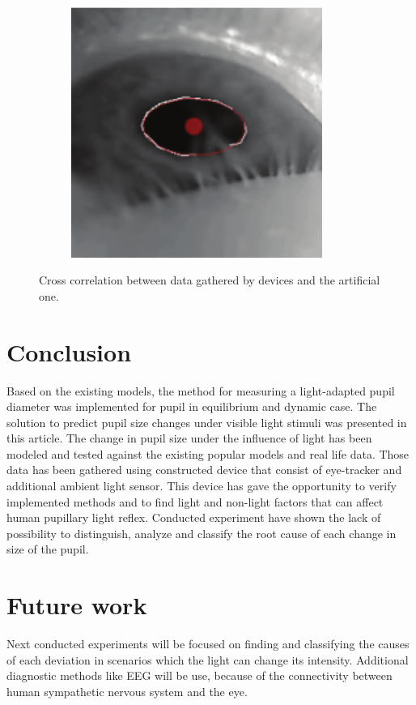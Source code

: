 \documentclass[USenglish,twocolumn]{article}
\begin{document}
\begin{figure}[H]
	\begin{subfigure}[b]{0.45\textwidth}
		\centering
		\includegraphics[width=0.9\textwidth]{img/PupilLab/6.png}
		\caption{}
		\label{fig:crossCorrelation3}
	\end{subfigure}
	\caption{Cross correlation between data gathered by devices and the artificial one.}	
	\label{fig:crossCorrelation}
\end{figure}
\fi

\section{Conclusion}
Based on the existing models, the method for measuring a light-adapted pupil diameter was implemented for pupil in equilibrium and dynamic case. The solution to predict pupil size changes under visible light stimuli was presented in this article. The change in pupil size under the influence of light has been modeled and tested against the existing popular models and real life data. Those data has been gathered using constructed device that consist of eye-tracker and additional ambient light sensor. This device has gave the opportunity to verify implemented methods and to find light and non-light factors that can affect human pupillary light reflex. Conducted experiment have shown the lack of possibility to distinguish, analyze and classify the root cause of each change in size of the pupil.
\section{Future work}
Next conducted experiments will be focused on finding and classifying the causes of each deviation in scenarios which the light can change its intensity. Additional diagnostic methods like EEG will be use, because of the connectivity between human sympathetic nervous system and the eye.
\end{document}
